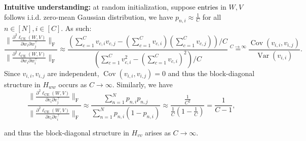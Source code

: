 \documentclass{article}
\newcommand{\1}{^{(1)}}
\newcommand{\2}{^{(2)}}
\newcommand{\zhaoruirevise}[1]{\textcolor{black}{ #1}}
\begin{document}
\begin{snugshade}
{\bf Intuitive understanding:} at random initialization, suppose \zhaoruirevise{entries} in $W, V$ follows i.i.d. zero-mean Gaussian distribution, we have $p_{n,i} \approx \frac{1}{C}$ for all $n \in [N], i \in [C]$. As such:
\begin{equation}
    \frac{\bigg\|    \frac{\partial^2\ell_{\text{CE}}(W,V)}{\partial w_i  \partial w_j^\top}
 \bigg\|_{\operatorname{F}}}{\bigg\|  \frac{\partial^2\ell_{\text{CE}}(W,V)}{\partial w_i  \partial w_i^\top} \bigg\|_{\operatorname{F}}}
  \approx  \frac{ \left(\sum_{c= 1}^C v_{c,i} v_{c,j}  - \left(\sum_{c=1}^C v_{c,i}\right)\left(\sum_{c=1}^C v_{c,j}\right) \right) /C  } {   \left(\sum_{c= 1}^C v_{c,i}^2 
 - \left(\sum_{c=1}^C v_{c,i}\right)^2\right) /C } \overset{C \rightarrow \infty}{=} \frac{\operatorname{Cov}(v_{i,i},v_{i,j})}{  \operatorname{Var}(v_{i,i})}.
\end{equation}
Since $v_{i,i},v_{i,j}$ are independent, $\operatorname{Cov}(v_{i,i},v_{i,j}) = 0$ and thus 
the block-diagonal structure in $H_{ww}$ occurs as $C\rightarrow \infty$. Similarly, we have
\begin{equation}
    \frac{\bigg\|    \frac{\partial^2\ell_{\text{CE}}(W,V)}{\partial v_i  \partial v_j^\top}
 \bigg\|_{\operatorname{F}}}{\bigg\|  \frac{\partial^2\ell_{\text{CE}}(W,V)}{\partial v_i  \partial v_i^\top} \bigg\|_{\operatorname{F}}
}
    \approx  \frac{\sum_{n=1}^N  p_{n,i} p_{n,j}} {\sum_{n=1}^N  p_{n,i} (1-p_{n,i})}\approx \frac{  \frac{1}{C^2}}{ \frac{1}{C}\left(1-\frac{1}{C}\right)} = \frac{1}{C-1},
\end{equation}

and thus 
the block-diagonal structure  in $H_{vv}$ arises as $C\rightarrow \infty$. 

\vspace{-0.2cm}
\end{snugshade}
\end{document}
